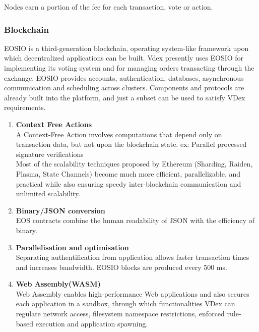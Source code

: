 \documentclass[]{article}
\begin{document}
{\begin{enumerate}
\end{enumerate}
Nodes earn a portion of the fee for each transaction, vote or action.
	
	\subsubsection{Blockchain}
	
	EOSIO is a third-generation blockchain, operating system-like framework upon which decentralized applications can be built.
	Vdex presently uses EOSIO for implementing its voting system and for managing orders transacting through the exchange. 
	EOSIO provides accounts, authentication, databases, asynchronous communication and scheduling across clusters. 
	Components and protocols are already built into the platform, and just a subset can be used to satisfy VDex requirements. 
	
	\begin{enumerate}
					
	        \item \textbf{Context Free Actions} \\
	A Context-Free Action involves computations that depend only on transaction data, but not upon the blockchain state.
	ex: Parallel processed signature verifications\\
	Most of the scalability techniques proposed by Ethereum (Sharding, Raiden, Plasma, State Channels) 
	become much more efficient, parallelizable, and practical while also ensuring speedy inter-blockchain communication and unlimited scalability.
	
	\item\textbf{ Binary/JSON conversion} \\
	EOS contracts combine the human readability of JSON with the efficiency of binary. \\
	
	\item \textbf{Parallelisation and optimisation\\ } 
	Separating authentification from application allows faster transaction times and increases bandwidth.
	EOSIO blocks are produced every 500 ms.
	
	\item \textbf{Web Assembly(WASM)}   \\
	Web Assembly enables high-performance Web applications and also secures each application in a sandbox, through which functionalities VDex can regulate network access, filesystem namespace restrictions, enforced rule-based execution and application spawning. 
	

\end{enumerate}}
\end{document}
